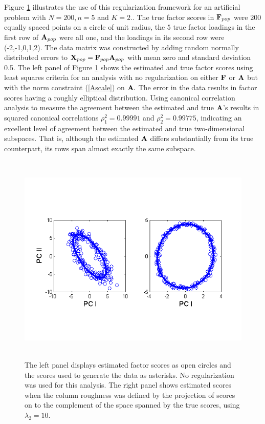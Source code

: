 \documentclass[12pt]{article}
\begin{document}
Figure \ref{MDA1} illustrates the use of this regularization framework for an artificial problem with $N = 200, n = 5$ and $K = 2.$.  The true factor scores in $\mbox{\bf F}_{pop}$ were $200$ equally spaced points on a circle of unit radius, the $5$ true factor loadings in the first row of $\mbox{\bf A}_{pop}$ were all one, and the loadings in its second row were (-2,-1,0,1,2).  The data matrix was constructed by adding random normally distributed errors to $\mbox{\bf X}_{pop} = \mbox{\bf F}_{pop} \mbox{\bf A}_{pop}$ with mean zero and standard deviation 0.5.  The left panel of Figure \ref{MDA1} shows the estimated and true factor scores using least squares criteria for an analysis with no regularization on either $\mbox{\bf F}$ or $\mbox{\bf A}$ but with the norm constraint (\ref{Ascale}) on $\mbox{\bf A}.$  The error in the data results in factor scores having a roughly elliptical distribution.  Using canonical correlation analysis to measure the agreement between the estimated and true $\mbox{\bf A}$'s results in squared canonical correlations $\rho_1^2 = 0.99991$ and $\rho_2^2 = 0.99775$, indicating an excellent level of agreement between the estimated and true two-dimensional subspaces. That is, although the estimated $\mbox{\bf A}$ differs substantially from its true counterpart, its rows span almost exactly the same subspace.

\begin{figure}
  \includegraphics[height=4in, width=6in]{figs/MDA1}
  \caption{The left panel displays estimated factor scores as open circles and the scores used to generate the data as asterisks.  No regularization was used for this analysis.  The right panel shows estimated scores when the column roughness was defined by the projection of scores on to the complement of the space spanned by the true scores, using $\lambda_2 = 10.$}
  \label{MDA1}
\end{figure}
\end{document}
